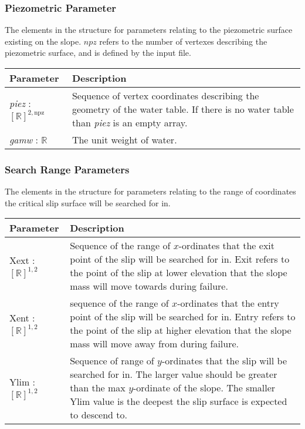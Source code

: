 \documentclass[12pt]{article}
\begin{document}
\subsubsection{Piezometric Parameter} \label{Tbl:PiezParam}
\noindent
The elements in the structure for parameters relating to the
piezometric surface existing on the slope. $npz$ refers to the number
of vertexes describing the piezometric surface, and is defined by the
input file.

\begin{center}
\begin{longtable}{ p{}
    p{}}\hline 
  \textbf{Parameter} & \textbf{Description}\\ \hline

  \textit{piez} : $[\mathbb{R}]^{2,\text{npz}}$ & Sequence of vertex
  coordinates describing the geometry of the water table. If there is
  no water table than \textit{piez} is an empty array. \\

  \textit{gamw} : $\mathbb{R}$ & The unit weight of water. \\ \hline
\end{longtable}
\end{center}

\subsubsection{Search Range Parameters} \label{Tbl:SearchParam}
\noindent
The elements in the structure for parameters relating to the range of
coordinates the critical slip surface will be searched for in.

\begin{center}
\begin{tabular}{ p{}
    p{}}\hline 

  \textbf{Parameter} &
  \textbf{Description}\\ \hline

  Xext : $[\mathbb{R}]^{1,2}$ & Sequence of the range of $x$-ordinates
  that the exit point of the slip will be searched for in. Exit refers
  to the point of the slip at lower elevation that the slope mass will
  move towards during failure. \\

  Xent : $[\mathbb{R}]^{1,2}$ & sequence of the range of $x$-ordinates
  that the entry point of the slip will be searched for in. Entry
  refers to the point of the slip at higher elevation that the slope
  mass will move away from during failure. \\

  Ylim : $[\mathbb{R}]^{1,2}$ & Sequence of range of $y$-ordinates
  that the slip will be searched for in. The larger value should be
  greater than the max $y$-ordinate of the slope. The smaller Ylim
  value is the deepest the slip surface is expected to descend
  to.\\ \hline
\end{tabular}
\end{center}
\end{document}

